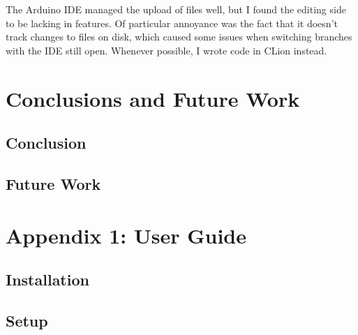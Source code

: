 \documentclass[a4paper]{article}
\begin{document}
The Arduino IDE managed the upload of files well, but I found the editing side to be lacking in features. Of particular annoyance was the fact that it doesn't track changes to files on disk, which caused some issues when switching branches with the IDE still open. Whenever possible, I wrote code in CLion instead.

\newpage
\section{Conclusions and Future Work}

\subsection{Conclusion}%


\subsection{Future Work}%


\newpage
\section{Appendix 1: User Guide}

\subsection{Installation}%


\subsection{Setup}%
\end{document}
